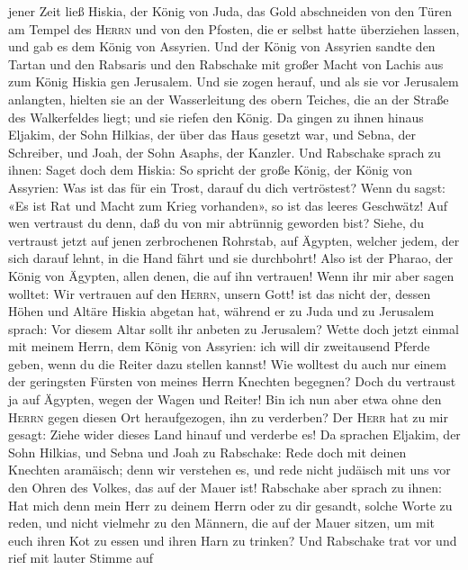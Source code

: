 jener Zeit ließ Hiskia, der König von Juda, das Gold abschneiden von den
Türen am Tempel des \textsc{Herrn} und von den Pfosten, die er selbst
hatte überziehen lassen, und gab es dem König von Assyrien.
 Und der König von Assyrien sandte den Tartan und den
Rabsaris und den Rabschake mit großer Macht von Lachis aus zum König
Hiskia gen Jerusalem. Und sie zogen herauf, und als sie vor Jerusalem
anlangten, hielten sie an der Wasserleitung des obern Teiches, die an
der Straße des Walkerfeldes liegt; und sie riefen den König.
 Da gingen zu ihnen hinaus Eljakim, der Sohn Hilkias, der
über das Haus gesetzt war, und Sebna, der Schreiber, und Joah, der Sohn
Asaphs, der Kanzler.  Und Rabschake sprach zu ihnen:
Saget doch dem Hiskia: So spricht der große König, der König von
Assyrien: Was ist das für ein Trost, darauf du dich vertröstest?
 Wenn du sagst: «Es ist Rat und Macht zum Krieg
vorhanden», so ist das leeres Geschwätz! Auf wen vertraust du denn, daß
du von mir abtrünnig geworden bist?  Siehe, du vertraust
jetzt auf jenen zerbrochenen Rohrstab, auf Ägypten, welcher jedem, der
sich darauf lehnt, in die Hand fährt und sie durchbohrt! Also ist der
Pharao, der König von Ägypten, allen denen, die auf ihn vertrauen!
 Wenn ihr mir aber sagen wolltet: Wir vertrauen auf den
\textsc{Herrn}, unsern Gott! ist das nicht der, dessen Höhen und Altäre
Hiskia abgetan hat, während er zu Juda und zu Jerusalem sprach: Vor
diesem Altar sollt ihr anbeten zu Jerusalem?  Wette doch
jetzt einmal mit meinem Herrn, dem König von Assyrien: ich will dir
zweitausend Pferde geben, wenn du die Reiter dazu stellen kannst!
 Wie wolltest du auch nur einem der geringsten Fürsten
von meines Herrn Knechten begegnen? Doch du vertraust ja auf Ägypten,
wegen der Wagen und Reiter!  Bin ich nun aber etwa ohne
den \textsc{Herrn} gegen diesen Ort heraufgezogen, ihn zu verderben? Der
\textsc{Herr} hat zu mir gesagt: Ziehe wider dieses Land hinauf und
verderbe es!  Da sprachen Eljakim, der Sohn Hilkias, und
Sebna und Joah zu Rabschake: Rede doch mit deinen Knechten aramäisch;
denn wir verstehen es, und rede nicht judäisch mit uns vor den Ohren des
Volkes, das auf der Mauer ist!  Rabschake aber sprach zu
ihnen: Hat mich denn mein Herr zu deinem Herrn oder zu dir gesandt,
solche Worte zu reden, und nicht vielmehr zu den Männern, die auf der
Mauer sitzen, um mit euch ihren Kot zu essen und ihren Harn zu trinken?
 Und Rabschake trat vor und rief mit lauter Stimme auf
